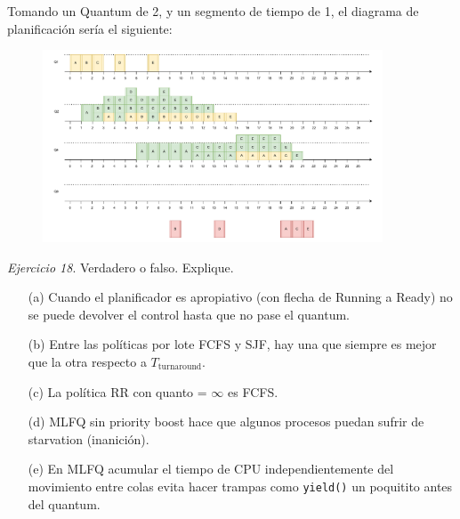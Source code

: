 \documentclass[12pt]{article}
\begin{document}
\begin{rta}
    Tomando un Quantum de 2, y un segmento de tiempo de 1, el diagrama de planificación sería el siguiente:
\end{rta}
\newpage
\begin{figure}[h]
    \centering
    \includegraphics[width=0.9\textwidth]{ej17.pdf}
\end{figure}

\noindent \textit{Ejercicio 18}. Verdadero o falso. Explique.

\begin{itemize}
    \item[(a)] Cuando el planificador es apropiativo (con flecha de Running a Ready) no se puede devolver el control hasta que no pase el quantum.
    \item[(b)] Entre las políticas por lote FCFS y SJF, hay una que siempre es mejor que la otra respecto a $T_\text{turnaround}$.
    \item[(c)] La política RR con quanto = $\infty$ es FCFS.
    \item[(d)] MLFQ sin priority boost hace que algunos procesos puedan sufrir de starvation (inanición). 
    \item[(e)] En MLFQ acumular el tiempo de CPU independientemente del movimiento entre colas evita hacer trampas como \texttt{yield()} un poquitito antes del quantum. 
\end{itemize}
\end{document}
